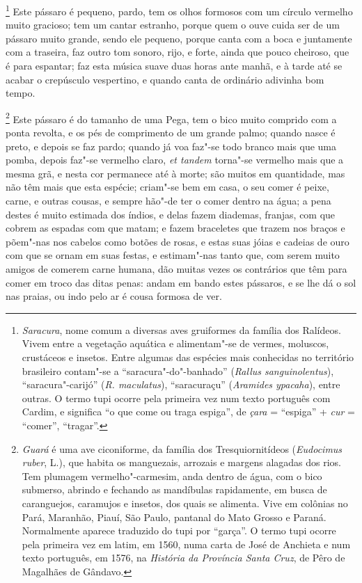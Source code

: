 \footnote{ \textit{Saracura}, nome comum a diversas
aves gruiformes da família dos Ralídeos. Vivem entre a vegetação
aquática e alimentam"-se de vermes, moluscos, crustáceos e insetos.
Entre algumas das espécies mais conhecidas no território brasileiro
contam"-se a ``saracura"-do"-banhado'' (\textit{Rallus sanguinolentus}), 
``saracura"-carijó'' (\textit{R. maculatus}), ``saracuraçu'' 
(\textit{Aramides ypacaha}), entre outras. O termo tupi ocorre pela
primeira vez num texto português com Cardim, e significa ``o que come
ou traga espiga'', de \textit{çara} = ``espiga'' + \textit{cur} = 
``comer'', ``tragar''.} Este pássaro é pequeno, pardo, tem os
olhos formosos com um círculo vermelho muito gracioso; tem um cantar
estranho, porque quem o ouve cuida ser de um pássaro muito grande,
sendo ele pequeno, porque canta com a boca e juntamente com a traseira,
faz outro tom sonoro, rijo, e forte, ainda que pouco cheiroso, que é
para espantar; faz esta música suave duas horas ante manhã, e à tarde
até se acabar o crepúsculo vespertino, e quando canta de ordinário
adivinha bom tempo.

\footnote{ \textit{Guará} é uma ave ciconiforme, da
família dos Tresquiornitídeos (\textit{Eudocimus ruber}, L.), que
habita os manguezais, arrozais e margens alagadas dos rios. Tem
plumagem vermelho"-carmesim, anda dentro de água, com o bico submerso,
abrindo e fechando as mandíbulas rapidamente, em busca de caranguejos,
caramujos e insetos, dos quais se alimenta. Vive em colônias no Pará,
Maranhão, Piauí, São Paulo, pantanal do Mato Grosso e Paraná.
Normalmente aparece traduzido do tupi por ``garça''. O termo tupi ocorre
pela primeira vez em latim, em 1560, numa carta de José de
Anchieta e num texto português, em 1576, na \textit{História da
Província Santa Cruz}, de Pêro de Magalhães de Gândavo.} Este
pássaro é do tamanho de uma Pega, tem o bico muito comprido com a ponta
revolta, e os pés de comprimento de um grande palmo; quando nasce é
preto, e depois se faz pardo; quando já voa faz"-se todo branco mais que
uma pomba, depois faz"-se vermelho claro, \textit{et tandem} torna"-se vermelho mais que a mesma grã, e
nesta cor permanece até à morte; são muitos em quantidade, mas não têm 
mais que esta espécie; criam"-se bem em casa, o seu comer é peixe,
carne, e outras cousas, e sempre hão"-de ter o comer dentro na água; a
pena destes é muito estimada dos índios, e delas fazem diademas,
franjas, com que cobrem as espadas com que matam; e fazem braceletes
que trazem nos braços e põem"-nas nos cabelos como botões de rosas, e
estas suas jóias e cadeias de ouro com que se ornam em suas festas, e 
estimam"-nas tanto que, com serem muito amigos de comerem carne humana,
dão muitas vezes os contrários que têm para comer em troco das ditas 
penas: andam em bando estes pássaros, e se lhe dá o sol nas praias, ou
indo pelo ar é cousa formosa de ver.

